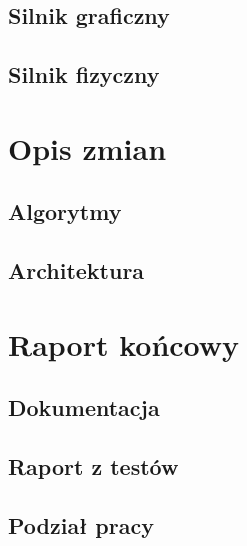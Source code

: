 	\section{Silnik graficzny}\label{sec:silnik graficzny}
	
	\section{Silnik fizyczny}\label{sec:silnik fizyczny}
	

	\chapter{Opis zmian}\label{chap:opis zmian}
	\section{Algorytmy}\label{sec:algorytmy}
	
	\section{Architektura}\label{sec:architektura-zmiany}
	

	\chapter{Raport końcowy}\label{chap:raport końcowy}
	\section{Dokumentacja}\label{sec:dokumentacja}
	
	\section{Raport z testów}\label{sec:raport z testów}
	
	\section{Podział pracy}\label{sec:podzial}
	

	

	\newpage
	
	\newpage



